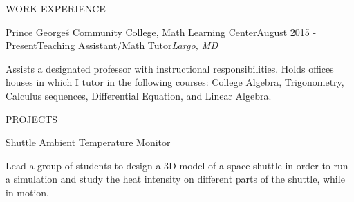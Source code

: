\documentclass{resume} %
\begin{document}
\begin{rSection}{\small WORK EXPERIENCE}
\begin{rSubsection}{Prince George\'s Community College, Math Learning Center}{August 2015 - Present}{Teaching Assistant/Math Tutor}{\em Largo, MD}
\item Assists a designated professor with instructional responsibilities. Holds offices houses in which I tutor in the following courses: College Algebra, Trigonometry, Calculus sequences, Differential Equation, and Linear Algebra.
\end{rSubsection}


\end{rSection}

 \begin{rSection}{\small PROJECTS}

\small %
\begin{rSubsection}{Shuttle Ambient Temperature Monitor}{}%
{}{}
\item Lead a group of students to design a 3D model of a space shuttle in order to run a simulation and study the heat intensity on different parts of the shuttle, while in motion.
\end{rSubsection}


 \end{rSection}
\end{document}
